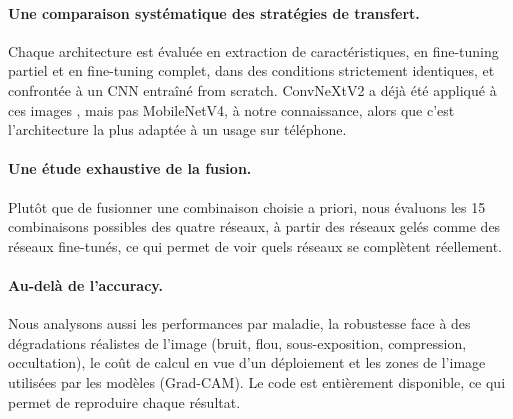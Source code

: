 \paragraph{Une comparaison systématique des stratégies de transfert.} Chaque architecture est évaluée en extraction de caractéristiques, en fine-tuning partiel et en fine-tuning complet, dans des conditions strictement identiques, et confrontée à un CNN entraîné from scratch. ConvNeXtV2 a déjà été appliqué à ces images \cite{indra2026sugarcane, ahmed2025agrihafnet}, mais pas MobileNetV4, à notre connaissance, alors que c'est l'architecture la plus adaptée à un usage sur téléphone.

\paragraph{Une étude exhaustive de la fusion.} Plutôt que de fusionner une combinaison choisie a priori, nous évaluons les 15 combinaisons possibles des quatre réseaux, à partir des réseaux gelés comme des réseaux fine-tunés, ce qui permet de voir quels réseaux se complètent réellement.

\paragraph{Au-delà de l'accuracy.} Nous analysons aussi les performances par maladie, la robustesse face à des dégradations réalistes de l'image (bruit, flou, sous-exposition, compression, occultation), le coût de calcul en vue d'un déploiement et les zones de l'image utilisées par les modèles (Grad-CAM). Le code est entièrement disponible, ce qui permet de reproduire chaque résultat.
